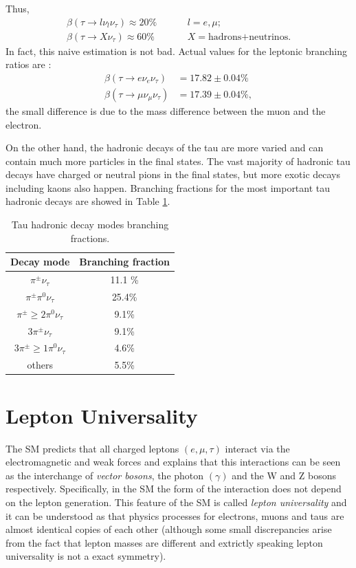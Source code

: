 Thus, 
\begin{align}
\beta(\tau\to l\nu_l\nu_\tau)\approx 20\%& \hspace{1cm}l=e,\mu;
\\
\beta(\tau\to X\nu_\tau)\approx 60\%& \hspace{1cm} X=\text{hadrons+neutrinos}.
\end{align}
In fact, this naive estimation is not bad. Actual values for the leptonic branching ratios are \cite{PhysRevD.98.030001}:
\begin{align}
\beta(\tau\to e\nu_e\nu_\tau)&=17.82\pm 0.04\%
\label{eq6}
\\
\beta(\tau\to \mu\nu_\mu\nu_\tau)&=17.39\pm 0.04\%,
\end{align}
the small difference is due to the mass difference between the muon and the electron.

On the other hand, the hadronic decays of the tau are more varied and can contain much more particles in the final states. The vast majority of hadronic tau decays have charged or neutral pions in the final states, but more exotic decays including kaons also happen. Branching fractions for the most important tau hadronic decays are showed in Table \ref{Table1}.
\begin{table}[]
	\centering
\begin{tabular}{|c|c|}
	\hline
	Decay mode                     & Branching fraction \\ \hline
	$\pi^\pm \nu_\tau$             & 11.1 \%            \\ \hline
	$\pi^\pm \pi^0 \nu_\tau$       & 25.4\%             \\ \hline
	$\pi^\pm \geq 2\pi^0 \nu_\tau$ & 9.1\%               \\ \hline
	$3\pi^\pm \nu_\tau$            & 9.1\%               \\ \hline
	$3\pi^\pm \geq 1\pi^0 \nu_\tau$& 4.6\%               \\ \hline
	others						   & 5.5\%               \\ \hline
\end{tabular}
	\caption{Tau hadronic decay modes branching fractions.}
	\label{Table1}
\end{table}
\section{Lepton Universality}\label{chap2sec2}
The SM predicts that all charged leptons $(e,\mu,\tau)$ interact via the electromagnetic and weak forces and explains that this interactions can be seen as the interchange of \textit{vector bosons}, the photon $(\gamma)$ and the W and Z bosons respectively. Specifically, in the SM the form of the interaction does not depend on the lepton generation. This feature of the SM is called \textit{lepton universality} and it can be understood as that physics processes for electrons, muons and taus are almost identical copies of each other (although some small discrepancies arise from the fact that lepton masses are different and extrictly speaking lepton universality is not a exact symmetry). 

